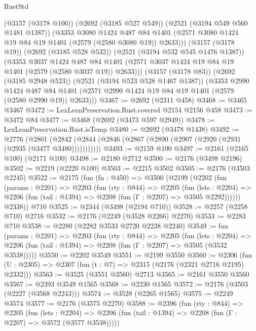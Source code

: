 \begin{lexlean}{RustStd}
\begin{coremodule}
          (@3157 (@3178 @100))
          (@2692 (@3185 @527 @549))
          (@2521 (@3194 @549 @560 @1481 @1387))
          (@3353
            @3080
            @1424
            @487
            @84
            @1401
            (@2571 @3080 @1424 @19 @84 @19 @1401 (@2579 (@2580 @3080 @19)) @2633)))
        (@3157 (@3178 @19))
        (@2692 (@3185 @528 @532))
        (@2521 (@3194 @532 @545 @1476 @1387))
        (@3353
          @3037
          @1424
          @487
          @84
          @1401
          (@2571 @3037 @1424 @19 @84 @19 @1401 (@2579 (@2580 @3037 @19)) @2633)))
      (@3157 (@3178 @83))
      (@2692 (@3185 @2948 @523))
      (@2521 (@3194 @523 @528 @1467 @1387))
      (@3353
        @2990
        @1424
        @487
        @84
        @1401
        (@2571 @2990 @1424 @19 @84 @19 @1401 (@2579 (@2580 @2990 @19)) @2633)))
@3467 := @2692 (@2311 @458)
@3468 := @3465 @3467
@3472 := LexLeanPreservation.Rust.covered @2154 @2156 @458
@3473 := @3472 @84
@3477 := @3468 (@2692 (@3473 @597 @2949))
@3478 := LexLeanPreservation.Rust.isTemp
@3480 := @2692 (@3478 @1438)
@3492 := @2776
    (@2801 (@2842 (@2844 (@2846 (@2867 (@2890 (@2907 (@2920 (@2931 (@2935 (@3477 @3480)))))))))))
@3493 := @2159 @100
@3497 := @2161 (@2165 @100) (@2171 @100)
@3498 := @2180 @2712
@3500 := @2176 (@3498 @2196)
@3502 := @2219 (@2220 @100)
@3503 := @2215 @3502
@3505 := @2176 (@3503 @2245)
@3522 := @2175
    (fun (fn : @450) =>
    @3500
      (@2199
        (@2202
          (fun (params : @2201) =>
          @2203
            (fun (rty : @844) =>
            @2205
              (fun (lets : @2204) =>
              @2206 (fun (tail : @1394) => @2208 (fun (Γ : @2207) => @3505 @2292))))))
        @2338))
    @710
@3525 := @2344 (@3498 (@2194 @710))
@3528 := @2257 (@2258 @710) @2716
@3532 := @2176 (@2249 (@3528 @2266) @2270)
@3533 := @2283 @710
@3538 := @2280 (@2282 @3533 @2720 @2238 @2240)
@3549 := fun (params : @2201) =>
  @2203
    (fun (rty : @844) =>
    @2205
      (fun (lets : @2204) =>
      @2206 (fun (tail : @1394) => @2208 (fun (Γ : @2207) => @3505 (@3532 @3538)))))
@3550 := @2202 @3549
@3551 := @2199 @3550
@3560 := @2306 (fun (U : @2305) => @2307 (fun (t : @7) => @2315 (@2176 (@2321 @2716 @2195) @2332)))
@3563 := @3525 (@3551 @3560) @2713
@3565 := @2161 @3550 @3560
@3567 := @2393 @3549 @1565
@3568 := @2230 @1565
@3572 := @2176 (@3503 (@2227 (@3568 @2243)))
@3574 := @3528 (@2265 @1565)
@3575 := @2249 @3574
@3577 := @2176 (@3575 @2270)
@3588 := @2396
    (fun (rty : @844) =>
    @2205
      (fun (lets : @2204) =>
      @2206 (fun (tail : @1394) => @2208 (fun (Γ : @2207) => @3572 (@3577 @3538)))))

\end{coremodule}
\end{lexlean}
